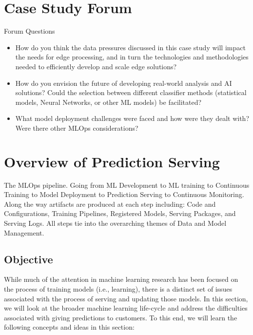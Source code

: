 {{{{{{\section{Case Study Forum}

Forum Questions

\begin{itemize}
  \item How do you think the data pressures discussed in this case study will impact the needs for edge processing, and in turn the technologies and methodologies needed to efficiently develop and scale edge solutions?
  \item How do you envision the future of developing real-world analysis and AI solutions? Could the selection between different classifier methods (statistical models, Neural Networks, or other ML models) be facilitated?
  \item What model deployment challenges were faced and how were they dealt with? Were there other MLOps considerations?
\end{itemize}



\section{Overview of Prediction Serving}


    The MLOps pipeline. Going from ML Development to ML training to Continuous Training to Model Deployment to Prediction Serving to Continuous Monitoring. Along the way artifacts are produced at each step including: Code and Configurations, Training Pipelines, Registered Models, Serving Packages, and Serving Logs. All steps tie into the overarching themes of Data and Model Management.
    
    \subsection{Objective}
    
    While much of the attention in machine learning research has been focused on the process of training models (i.e., learning), there is a distinct set of issues associated with the process of serving and updating those models. In this section, we will look at the broader machine learning life-cycle and address the difficulties associated with giving predictions to customers. To this end, we will learn the following concepts and ideas in this section:
    
}}}}}}
